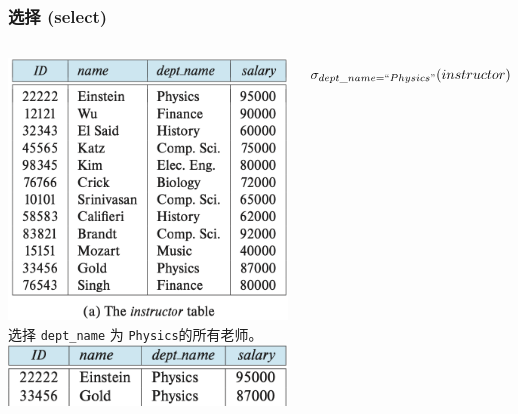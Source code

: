 \documentclass[aspectratio=169, 14pt]{beamer}
\begin{document}
\begin{frame}
    \frametitle{选择 (select)}

    \begin{columns}
        \includegraphics[width=\textwidth]{table/instructor}
        \alert{选择} \texttt{dept\_name} 为 \texttt{Physics}的所有老师。
        \includegraphics[width=\textwidth]{table/select-instructor}
        \pause
        
        \large{\[\sigma_{dept\_name =  ``Physics"}(instructor)\]}

    \end{columns}

\end{frame}
\end{document}
